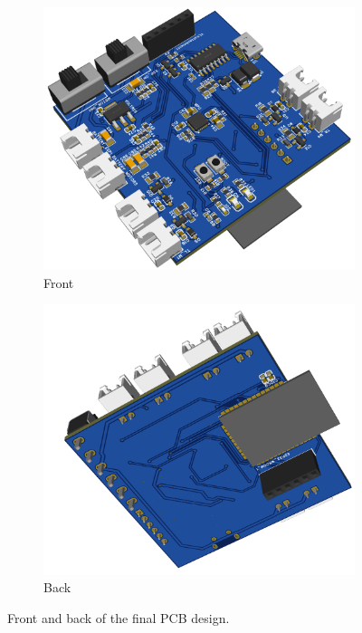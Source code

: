 \begin{figure}[H]
    \centering
    \captionsetup{justification=centering, margin=1cm}
    \begin{subfigure}[b]{0.48\textwidth}
        \centering
        \includegraphics[width=\textwidth]{img/final-pcb2.png}
        \caption{Front}
        \label{fig:pcb-front}
    \end{subfigure}
    \hfill
    \begin{subfigure}[b]{0.48\textwidth}
        \centering
        \includegraphics[width=\textwidth]{img/final-pcb-back.png}
        \caption{Back}
        \label{fig:pcb-back}
    \end{subfigure}
    \caption{Front and back of the final PCB design.}
    \label{fig:pcb-final}
\end{figure}

